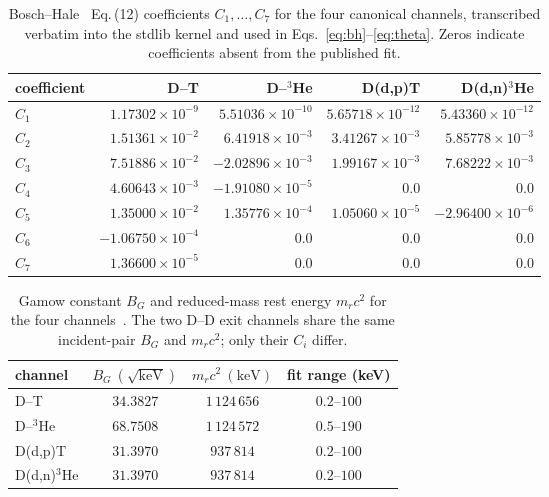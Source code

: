 \begin{table}[h]
\centering
\footnotesize
\setlength{\tabcolsep}{4pt}
\begin{tabular}{@{}l r r r r@{}}
\toprule
\textbf{coefficient} & \textbf{D--T} & \textbf{D--$^3$He} & \textbf{D(d,p)T} & \textbf{D(d,n)$^3$He} \\
\midrule
$C_1$ & $1.17302\times10^{-9}$  & $5.51036\times10^{-10}$ & $5.65718\times10^{-12}$ & $5.43360\times10^{-12}$ \\
$C_2$ & $1.51361\times10^{-2}$  & $6.41918\times10^{-3}$  & $3.41267\times10^{-3}$  & $5.85778\times10^{-3}$  \\
$C_3$ & $7.51886\times10^{-2}$  & $-2.02896\times10^{-3}$ & $1.99167\times10^{-3}$  & $7.68222\times10^{-3}$  \\
$C_4$ & $4.60643\times10^{-3}$  & $-1.91080\times10^{-5}$ & $0.0$                   & $0.0$                   \\
$C_5$ & $1.35000\times10^{-2}$  & $1.35776\times10^{-4}$  & $1.05060\times10^{-5}$  & $-2.96400\times10^{-6}$ \\
$C_6$ & $-1.06750\times10^{-4}$ & $0.0$                   & $0.0$                   & $0.0$                   \\
$C_7$ & $1.36600\times10^{-5}$  & $0.0$                   & $0.0$                   & $0.0$                   \\
\bottomrule
\end{tabular}
\caption{Bosch--Hale~\citep{boschhale1992} Eq.\,(12) coefficients
$C_1,\dots,C_7$ for the four canonical channels, transcribed verbatim into
the stdlib kernel and used in Eqs.~\eqref{eq:bh}--\eqref{eq:theta}. Zeros
indicate coefficients absent from the published fit.}
\label{tab:bh-coeffs}
\end{table}

\begin{table}[h]
\centering
\footnotesize
\begin{tabular}{@{}l c c c@{}}
\toprule
\textbf{channel} & $B_G\ (\sqrt{\text{keV}})$ & $m_r c^2\ (\text{keV})$ & \textbf{fit range (keV)} \\
\midrule
D--T            & $34.3827$ & $1\,124\,656$ & $0.2$--$100$ \\
D--$^3$He       & $68.7508$ & $1\,124\,572$ & $0.5$--$190$ \\
D(d,p)T         & $31.3970$ & $937\,814$    & $0.2$--$100$ \\
D(d,n)$^3$He    & $31.3970$ & $937\,814$    & $0.2$--$100$ \\
\bottomrule
\end{tabular}
\caption{Gamow constant $B_G$ and reduced-mass rest energy $m_r c^2$ for the
four channels~\citep{boschhale1992}. The two D--D exit channels share the
same incident-pair $B_G$ and $m_r c^2$; only their $C_i$ differ.}
\label{tab:bh-gamow}
\end{table}

